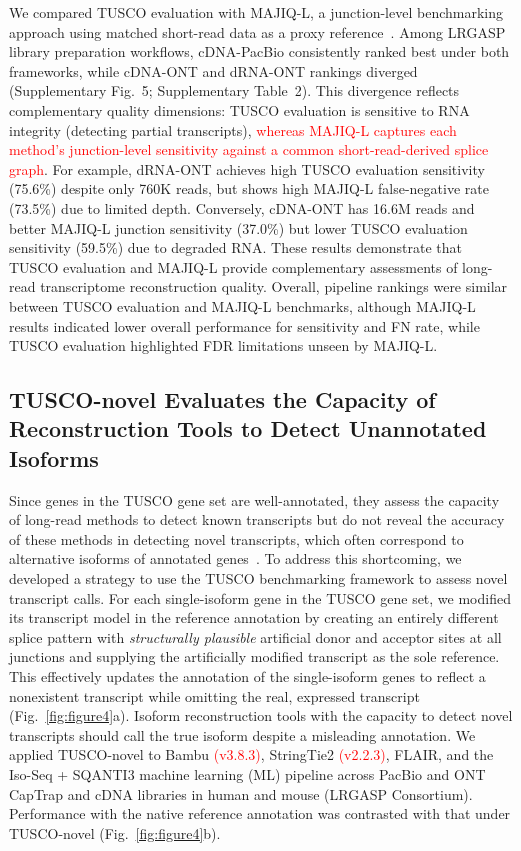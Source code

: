 \documentclass[pdflatex,sn-nature]{sn-jnl}%
\newcommand{\tuscoGeneSet}{TUSCO gene set}
\newcommand{\tuscoBenchmarkingFramework}{TUSCO benchmarking framework}
\newcommand{\tuscoEvaluation}{TUSCO evaluation}
\newcommand{\tuscoNovel}{TUSCO-novel}
\begin{document}
We compared \tuscoEvaluation{} with MAJIQ-L, a junction-level benchmarking approach using matched short-read data as a proxy reference~\cite{han_contrasting_2024}. Among LRGASP library preparation workflows, cDNA-PacBio consistently ranked best under both frameworks, while cDNA-ONT and dRNA-ONT rankings diverged (Supplementary Fig.~5; Supplementary Table~2). This divergence reflects complementary quality dimensions: \tuscoEvaluation{} is sensitive to RNA integrity (detecting partial transcripts), \textcolor{red}{whereas MAJIQ-L captures each method's junction-level sensitivity against a common short-read-derived splice graph}. For example, dRNA-ONT achieves high \tuscoEvaluation{} sensitivity (75.6\%) despite only 760K reads, but shows high MAJIQ-L false-negative rate (73.5\%) due to limited depth. Conversely, cDNA-ONT has 16.6M reads and better MAJIQ-L junction sensitivity (37.0\%) but lower \tuscoEvaluation{} sensitivity (59.5\%) due to degraded RNA. These results demonstrate that \tuscoEvaluation{} and MAJIQ-L provide complementary assessments of long-read transcriptome reconstruction quality. Overall, pipeline rankings were similar between \tuscoEvaluation{} and MAJIQ-L benchmarks, although MAJIQ-L results indicated lower overall performance for sensitivity and FN rate, while \tuscoEvaluation{} highlighted FDR limitations unseen by MAJIQ-L.

\subsection{\tuscoNovel{} Evaluates the Capacity of Reconstruction Tools to Detect Unannotated Isoforms}

Since genes in the \tuscoGeneSet{} are well-annotated, they assess the capacity of long-read methods to detect known transcripts but do not reveal the accuracy of these methods in detecting novel transcripts, which often correspond to alternative isoforms of annotated genes~\cite{wang_alternative_2008,pan_deep_2008,su_comprehensive_2024}. To address this shortcoming, we developed a strategy to use the \tuscoBenchmarkingFramework{} to assess novel transcript calls. For each single-isoform gene in the \tuscoGeneSet{}, we modified its transcript model in the reference annotation by creating an entirely different splice pattern with \emph{structurally plausible} artificial donor and acceptor sites at all junctions and supplying the artificially modified transcript as the sole reference. This effectively updates the annotation of the single-isoform genes to reflect a nonexistent transcript while omitting the real, expressed transcript (Fig.~\ref{fig:figure4}a). Isoform reconstruction tools with the capacity to detect novel transcripts should call the true isoform despite a misleading annotation. We applied \tuscoNovel{} to Bambu \textcolor{red}{(v3.8.3)}, StringTie2 \textcolor{red}{(v2.2.3)}, FLAIR, and the Iso-Seq + SQANTI3 machine learning (ML) pipeline across PacBio and ONT CapTrap and cDNA libraries in human and mouse (LRGASP Consortium). Performance with the native reference annotation was contrasted with that under \tuscoNovel{} (Fig.~\ref{fig:figure4}b).
\end{document}
